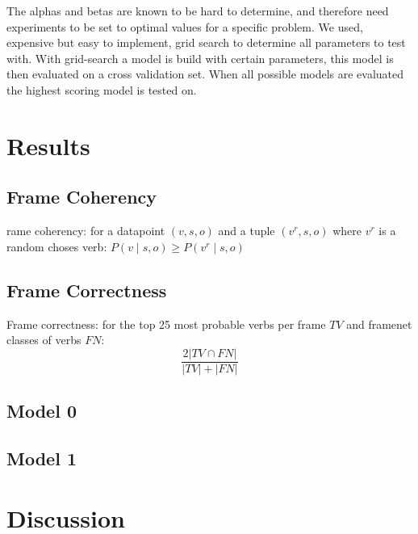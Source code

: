 \documentclass{article} %
\begin{document}
The alphas and betas are known \citep{oconnor2013} to be hard to determine, and therefore need experiments to be set to optimal values for a specific problem. We used, expensive but easy to implement, grid search to determine all parameters to test with. With grid-search a model is build with certain parameters, this model is then evaluated on a cross validation set. When all possible models are evaluated the highest scoring model is tested on. 

\section{Results}
\label{results}
\subsection{Frame Coherency}
rame coherency: for a datapoint $(v,s,o)$ and a tuple $(v^r,s,o)$ where $v^r$ is a random choses verb: $P(v\mid s,o) \geq P(v^r\mid s,o)$  
\subsection{Frame Correctness}

Frame correctness: for the top 25 most probable verbs per frame $TV$ and framenet classes of verbs $FN$: \[\frac{2|TV\cap FN|}{|TV|+|FN|}\]

\subsection{Model 0}
\subsection{Model 1}


\section{Discussion}
\end{document}

